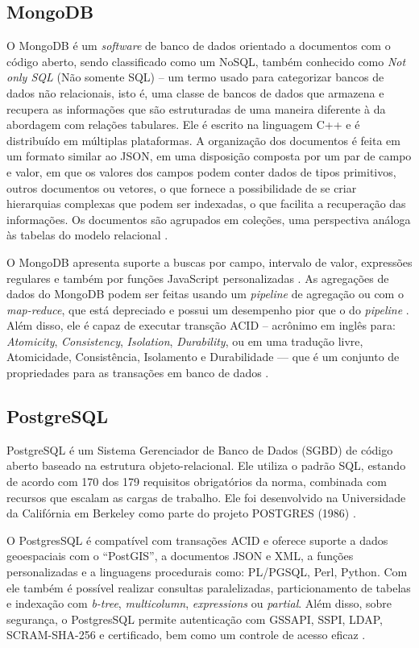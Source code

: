 \subsection{MongoDB}
\label{subsec:mongo}
O MongoDB é um \textit{software} de banco de dados orientado a documentos com o código aberto, sendo classificado como um NoSQL, também conhecido como \textit{Not only SQL} (Não somente SQL) – um termo usado para categorizar bancos de dados não relacionais, isto é, uma classe de bancos de dados que armazena e recupera as informações que são estruturadas de uma maneira diferente à da abordagem com relações tabulares. Ele é escrito na linguagem C++ e é distribuído em múltiplas plataformas. A organização dos documentos é feita em um formato similar ao JSON, em uma disposição composta por um par de campo e valor, em que os valores dos campos podem conter dados de tipos primitivos, outros documentos ou vetores, o que fornece a possibilidade de se criar hierarquias complexas que podem ser indexadas, o que facilita a recuperação das informações. Os documentos são agrupados em coleções, uma perspectiva análoga às tabelas do modelo relacional \cite{mongoDB2021}.

O MongoDB apresenta suporte a buscas por campo, intervalo de valor, expressões regulares e também por funções JavaScript personalizadas \cite{mongoDB2021}. As agregações de dados do MongoDB podem ser feitas usando um \textit{pipeline} de agregação ou com o \textit{map-reduce}, que está depreciado e possui um desempenho pior que o do \textit{pipeline} \cite{mongoDBagregacao}. Além disso, ele é capaz de executar transção ACID – acrônimo em inglês para: \textit{Atomicity}, \textit{Consistency}, \textit{Isolation}, \textit{Durability}, ou em uma tradução livre, Atomicidade, Consistência, Isolamento e Durabilidade — que é um conjunto de propriedades para as transações em banco de dados \cite{mongoDBACID}.


\subsection{PostgreSQL}
\label{subsec:postgres}
PostgreSQL é um Sistema Gerenciador de Banco de Dados (SGBD) de código aberto baseado na estrutura objeto-relacional. Ele utiliza o padrão SQL, estando de acordo com 170 dos 179 requisitos obrigatórios da norma, combinada com recursos que escalam as cargas de trabalho. Ele foi desenvolvido na Universidade da Califórnia em Berkeley como parte do projeto POSTGRES (1986) \cite{postgresAbout}.

O PostgresSQL é compatível com transações ACID e oferece suporte a dados geoespaciais com o \enquote{PostGIS}, a documentos JSON e XML, a funções personalizadas e a linguagens procedurais como: PL/PGSQL, Perl, Python. Com ele também é possível realizar consultas paralelizadas, particionamento de tabelas e indexação com \textit{b-tree}, \textit{multicolumn}, \textit{expressions} ou \textit{partial}. Além disso, sobre segurança, o PostgresSQL permite autenticação com GSSAPI, SSPI, LDAP, SCRAM-SHA-256 e certificado, bem como um controle de acesso eficaz \cite{postgresAbout}.